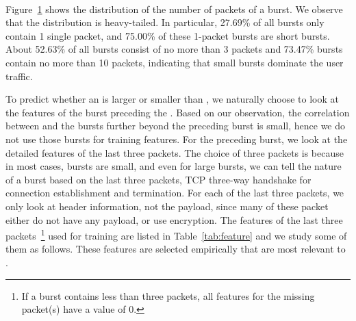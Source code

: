 \begin{figure}[t]
\centering
{} \\
\label{fig:packetNum}
\end{figure}
Figure~\ref{fig:packetNum} shows the distribution of the number of packets of a burst. We observe that the distribution is heavy-tailed. In particular, 27.69\% of all bursts only contain 1 single packet, and 75.00\% of these 1-packet bursts are short bursts. About 52.63\% of all bursts consist of no more than 3 packets and 73.47\% bursts contain no more than 10 packets, indicating that small bursts dominate the user traffic.



To predict whether an \IBT is larger or smaller than \SBT, we naturally choose to look at the features of the burst preceding the \IBT. Based on our observation, the correlation between \IBT and the bursts further beyond the preceding burst is small, hence we do not use those bursts for training features. For the preceding burst, we look at the detailed features of the last three packets. The choice of three packets is because in most cases, bursts are small, and even for large bursts, we can tell the nature of a burst based on the last three packets, \eg TCP three-way handshake for connection establishment and termination. For each of the last three packets, we only look at header information, not the payload, since many of these packet either do not have any payload, or use encryption.
The features of the last three packets~\footnote{If a burst contains less than three packets, all features for the missing packet(s) have a value of 0.} used for training are listed in Table~\ref{tab:feature} and we study some of them as follows. These features are selected empirically that are most relevant to \IBT.



